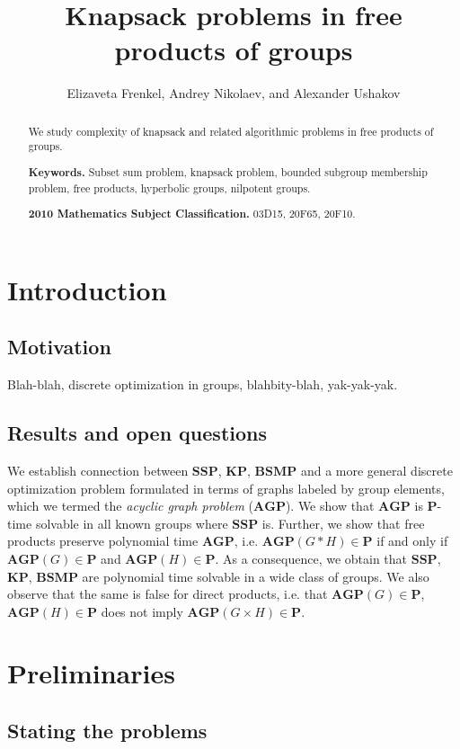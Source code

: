 \documentclass[10pt]{amsart}
\title{Knapsack problems in free products of groups}
\author[]{Elizaveta Frenkel, Andrey Nikolaev, and Alexander Ushakov}
\theoremstyle{definition}
\def\P{{\mathbf{P}}}
\def\SSP{{\mathbf{SSP}}}
\def\BSMP{{\mathbf{BSMP}}}
\def\KP{{\mathbf{KP}}}
\def\AGP{{\mathbf{AGP}}}
\begin{document}
\maketitle

\begin{abstract}
We study complexity of knapsack and related algorithmic problems in free products of groups.

\noindent
{\bf Keywords.} Subset sum problem,  knapsack problem, bounded subgroup membership problem, free products, hyperbolic groups, nilpotent groups.

\noindent
{\bf 2010 Mathematics Subject Classification.} 03D15, 20F65, 20F10.
\end{abstract}

\tableofcontents

\section{Introduction}\label{sec:intro}


\subsection{Motivation}\label{sub:motivation}
Blah-blah, discrete optimization in groups, blahbity-blah, yak-yak-yak.

\subsection{Results and open questions}\label{sub:results}
We establish connection between $\SSP$, $\KP$, $\BSMP$ and a more general discrete optimization problem formulated in terms of graphs labeled by group elements, which we termed the {\em acyclic graph problem} ($\AGP$). We show that $\AGP$ is $\P$-time solvable in all known groups where $\SSP$ is. Further, we show that free products preserve polynomial time $\AGP$, i.e. $\AGP(G* H)\in\P$ if and only if $\AGP(G)\in\P$ and $\AGP(H)\in\P$. As a consequence, we obtain that $\SSP$, $\KP$, $\BSMP$ are polynomial time solvable in a wide class of groups. We also observe that the same is false for direct products, i.e. that $\AGP(G)\in\P$, $\AGP(H)\in\P$ does not imply $\AGP(G\times H)\in\P$.


\section{Preliminaries}\label{sec:prelim}
\subsection{Stating the problems} \label{sec:problems}
\end{document}

